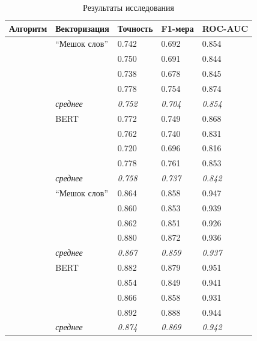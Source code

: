 \begin{table}[H]
	\begin{center}
		\captionsetup{justification=centering}
		\caption{\label{table:result2} Результаты исследования}
		\begin{tabular}{|p{3cm}|p{4cm}|p{2.4cm}|p{2.4cm}|p{2.4cm}|}
				\hline
			Алгоритм & Векторизация & Точность & F1-мера & ROC-AUC \\
				\hline\hline
				
& ``Мешок слов'' & 0.742 & 0.692 & 0.854 \\
				&& 0.750 & 0.691 & 0.844 \\
				&& 0.738 & 0.678 & 0.845 \\
				&& 0.778 & 0.754 & 0.874 \\
				 & \textit{среднее} & \textit{0.752} & \textit{0.704} & \textit{0.854} \\
		  & BERT & 0.772 & 0.749 & 0.868 \\
				&& 0.762 & 0.740 & 0.831 \\
				&& 0.720 & 0.696 & 0.816 \\
				&& 0.778 & 0.761 & 0.853 \\
				 & \textit{среднее} & \textit{0.758} & \textit{0.737} & \textit{0.842} \\
			\hline\hline
			
& ``Мешок слов'' & 0.864 & 0.858 & 0.947 \\
				&& 0.860 & 0.853 & 0.939 \\
				&& 0.862 & 0.851 & 0.926 \\
				&& 0.880 & 0.872 & 0.936 \\
				 & \textit{среднее} & \textit{0.867} & \textit{0.859} & \textit{0.937} \\
		  & BERT & 0.882 & 0.879 & 0.951 \\
				&& 0.854 & 0.849 & 0.941 \\
				&& 0.866 & 0.858 & 0.931 \\
				&& 0.892 & 0.888 & 0.944 \\
				 & \textit{среднее} & \textit{0.874} & \textit{0.869} & \textit{0.942} \\
			\hline\hline
			

\end{tabular}
\end{center}
\end{table}
